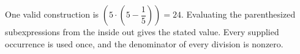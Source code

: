 One valid construction is $\boxed{(5\cdot (5-\dfrac{1}{5}))=24}$. Evaluating the parenthesized subexpressions from the inside out gives the stated value. Every supplied occurrence is used once, and the denominator of every division is nonzero.
